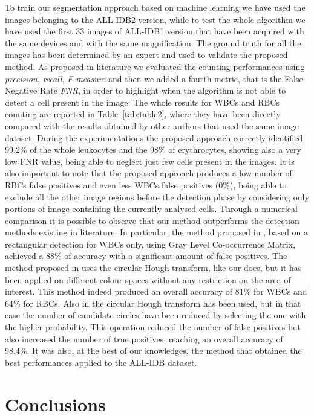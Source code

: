 \documentclass[final,a4paper,12pt,english]{UnicaPhdThesis3}
\begin{document}
To train our segmentation approach based on machine learning we have used the images belonging to the ALL-IDB2 version, while to test the whole algorithm we have used the first 33 images of ALL-IDB1 version that have been acquired with the same devices and with the same magnification. The ground truth for all the images has been determined by an expert and used to validate the proposed method. As proposed in literature we evaluated the counting performances using \textit{precision}, \textit{recall}, \textit{F-measure} and then we added a fourth metric, that is the False Negative Rate \textit{FNR}, in order to highlight when the algorithm is not able to detect a cell present in the image. The whole results for WBCs and RBCs counting are reported in Table~\ref{tab:table2}, where they have been directly compared with the results obtained by other authors that used the same image dataset.
During the experimentations the proposed approach correctly identified 99.2\% of the whole leukocytes and the 98\% of erythrocytes, showing also a very low FNR value, being able to neglect just few cells present in the images. It is also important to note that the proposed approach produces a low number of RBCs false positives and even less WBCs false positives (0\%), being able to exclude all the other image regions before the detection phase by considering only portions of image containing the currently analysed cells. Through a numerical comparison it is possible to observe that our method outperforms the detection methods existing in literature. In particular, the method proposed in \cite{Alilou}, based on a rectangular detection for WBCs only, using Gray Level Co-occurrence Matrix, achieved a 88\% of accuracy with a significant amount of false positives. The method proposed in \cite{Mahmood} uses the circular Hough transform, like our does, but it has been applied on different colour spaces without any restriction on the area of interest. This method indeed produced an overall accuracy of 81\% for WBCs and 64\% for RBCs. Also in \cite{Alomari} the circular Hough transform has been used, but in that case the number of candidate circles have been reduced by selecting the one with the higher probability. This operation reduced the number of false positives but also increased the number of true positives, reaching an overall accuracy of 98.4\%. It was also, at the best of our knowledges, the method that obtained the best performances applied to the ALL-IDB dataset. 

\part{Conclusions} 
\end{document}
